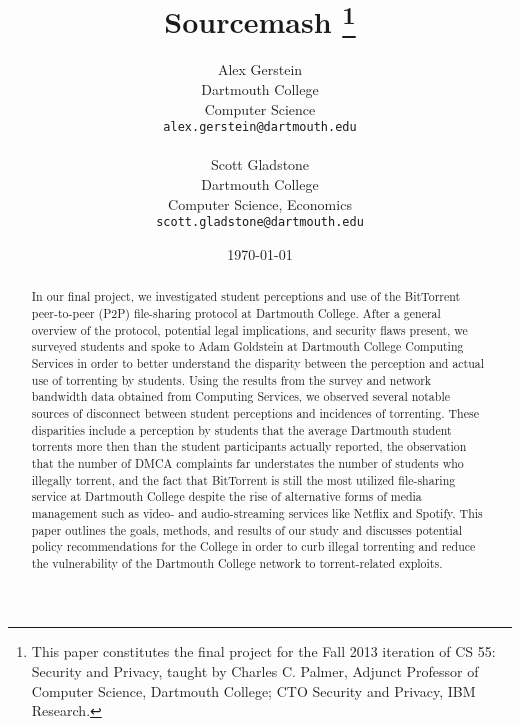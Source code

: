 \documentclass[11pt]{article}
\title{\textbf{Sourcemash \footnote{This paper constitutes the final project for the Fall 2013 iteration of CS 55: Security and Privacy, taught by Charles C. Palmer, Adjunct Professor of Computer Science, Dartmouth College; CTO Security and Privacy, IBM Research.}}}
\author{
	Alex Gerstein \\ Dartmouth College\\ Computer Science \\ \texttt{alex.gerstein@dartmouth.edu} 
	\\ \\
	Scott Gladstone \\ Dartmouth College\\ Computer Science, Economics\\ \texttt{scott.gladstone@dartmouth.edu}
	}
\date{\today}
\begin{document}
\maketitle
\begin{abstract}
In our final project, we investigated student perceptions and use of the BitTorrent peer-to-peer (P2P) file-sharing protocol at Dartmouth College. After a general overview of the protocol, potential legal implications, and security flaws present, we surveyed students and spoke to Adam Goldstein at Dartmouth College Computing Services in order to better understand the disparity between the perception and actual use of torrenting by students. Using the results from the survey and network bandwidth data obtained from Computing Services, we observed several notable sources of disconnect between student perceptions and incidences of torrenting. These disparities include a perception by students that the average Dartmouth student torrents more then than the student participants actually reported, the observation that the number of DMCA complaints far understates the number of students who illegally torrent, and the fact that BitTorrent is still the most utilized file-sharing service at Dartmouth College despite the rise of alternative forms of media management such as video- and audio-streaming services like Netflix and Spotify. This paper outlines the goals, methods, and results of our study and discusses potential policy recommendations for the College in order to curb illegal torrenting and reduce the vulnerability of the Dartmouth College network to torrent-related exploits.
\end{abstract}

\end{document}
